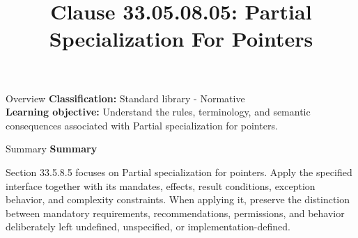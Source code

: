 \documentclass[10pt,letterpaper]{article}
\title{Clause 33.05.08.05: Partial Specialization For Pointers}
\author{}
\date{}
\begin{document}
\maketitle
\begin{CornellOverviewBox}{Overview}
\textbf{Classification:} Standard library - Normative\\[2pt]
\textbf{Learning objective:} Understand the rules, terminology, and semantic consequences associated with Partial specialization for pointers.
\end{CornellOverviewBox}\begin{CornellSummaryBox}{Summary}
{\sffamily\bfseries\color{Accent} Summary}\par\vspace{3pt}Section 33.5.8.5 focuses on Partial specialization for pointers. Apply the specified interface together with its mandates, effects, result conditions, exception behavior, and complexity constraints. When applying it, preserve the distinction between mandatory requirements, recommendations, permissions, and behavior deliberately left undefined, unspecified, or implementation-defined.
\end{CornellSummaryBox}
\end{document}
